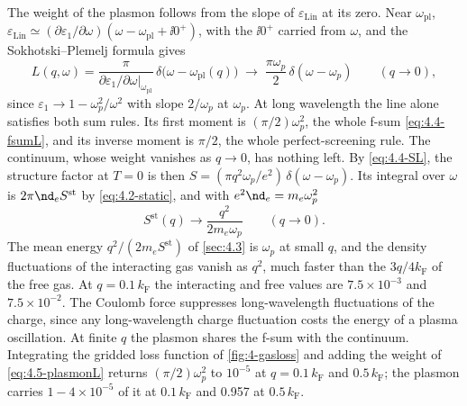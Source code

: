 The weight of the plasmon follows from the slope of $\varepsilon_{\mathrm{Lin}}$ at its zero. Near $\omega_{\mathrm{pl}}$, $\varepsilon_{\mathrm{Lin}} \simeq (\partial\varepsilon_1/\partial\omega)(\omega - \omega_{\mathrm{pl}} + \ii0^+)$, with the $\ii0^+$ carried from $\omega$, and the Sokhotski--Plemelj formula gives
\begin{equation}
  L(q,\omega) = \frac{\pi}{\partial\varepsilon_1/\partial\omega|_{\omega_{\mathrm{pl}}}}\,\delta\bigl(\omega - \omega_{\mathrm{pl}}(q)\bigr) \;\to\; \frac{\pi\omega_p}{2}\,\delta(\omega - \omega_p) \qquad (q \to 0) ,
  \label{eq:4.5-plasmonL}
\end{equation}
since $\varepsilon_1 \to 1 - \omega_p^2/\omega^2$ with slope $2/\omega_p$ at $\omega_p$. At long wavelength the line alone satisfies both sum rules. Its first moment is $(\pi/2)\omega_p^2$, the whole f-sum \cref{eq:4.4-fsumL}, and its inverse moment is $\pi/2$, the whole perfect-screening rule. The continuum, whose weight vanishes as $q \to 0$, has nothing left. By \cref{eq:4.4-SL}, the structure factor at $T = 0$ is then $S = (\pi q^2\omega_p/e^2)\,\delta(\omega - \omega_p)$. Its integral over $\omega$ is $2\pi\nd_eS^{\mathrm{st}}$ by \cref{eq:4.2-static}, and with $e^2\nd_e = m_e\omega_p^2$
\begin{equation*}
  S^{\mathrm{st}}(q) \to \frac{q^2}{2m_e\omega_p} \qquad (q \to 0) .
\end{equation*}
The mean energy $q^2/(2m_eS^{\mathrm{st}})$ of \cref{sec:4.3} is $\omega_p$ at small $q$, and the density fluctuations of the interacting gas vanish as $q^2$, much faster than the $3q/4k_{\mathrm{F}}$ of the free gas. At $q = 0.1\,k_{\mathrm{F}}$ the interacting and free values are $7.5\times10^{-3}$ and $7.5\times10^{-2}$. The Coulomb force suppresses long-wavelength fluctuations of the charge, since any long-wavelength charge fluctuation costs the energy of a plasma oscillation. At finite $q$ the plasmon shares the f-sum with the continuum. Integrating the gridded loss function of \cref{fig:4-gasloss} and adding the weight of \cref{eq:4.5-plasmonL} returns $(\pi/2)\omega_p^2$ to $10^{-5}$ at $q = 0.1\,k_{\mathrm{F}}$ and $0.5\,k_{\mathrm{F}}$; the plasmon carries $1 - 4\times10^{-5}$ of it at $0.1\,k_{\mathrm{F}}$ and 0.957 at $0.5\,k_{\mathrm{F}}$.

